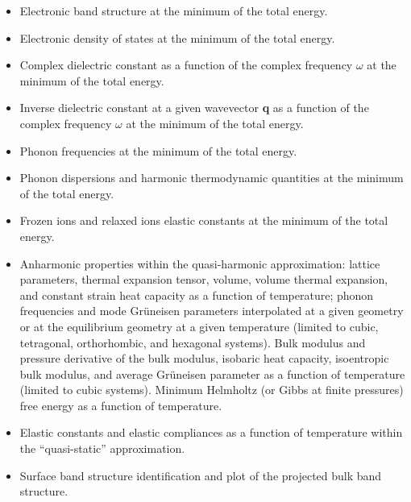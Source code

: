 \documentclass[12pt,a4paper]{article}
\begin{document}
\begin{itemize}
\item Electronic band structure at the minimum of the total energy.

\item Electronic density of states at the minimum of the total energy.

\item Complex dielectric constant as a function of the complex
frequency $\omega$ at the minimum of the total energy.

\item Inverse dielectric constant at a given wavevector {\bf q} as a function 
of the complex frequency $\omega$ at the minimum of the total energy.

\item Phonon frequencies at the minimum of the total energy.

\item Phonon dispersions and harmonic thermodynamic quantities
at the minimum of the total energy.

\item Frozen ions and relaxed ions elastic constants at the minimum of the total
energy.

\item Anharmonic properties within the quasi-harmonic approximation: 
lattice parameters, thermal expansion tensor, volume, volume thermal 
expansion, and constant strain heat capacity as a function of temperature; 
phonon frequencies and mode Gr\"uneisen parameters interpolated at a given
geometry or at the equilibrium geometry at a given temperature
(limited to cubic, tetragonal, orthorhombic, and hexagonal systems).
Bulk modulus and pressure derivative of the bulk modulus, isobaric heat 
capacity, isoentropic bulk modulus, and average Gr\"uneisen parameter as 
a function of temperature (limited to cubic systems).
Minimum Helmholtz (or Gibbs at finite pressures) free energy 
as a function of temperature.

\item Elastic constants and elastic compliances as a function of temperature 
within the ``quasi-static'' approximation.

\item Surface band structure identification and plot of the projected bulk
band structure.

\end{itemize}
\end{document}
